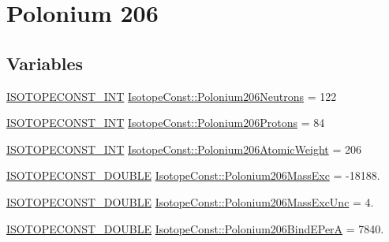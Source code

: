 \hypertarget{group___isotope_const-_polonium-_po206}{}\section{Polonium 206}
\label{group___isotope_const-_polonium-_po206}
\subsection*{Variables}
\begin{DoxyCompactItemize}
\item 
\mbox{\hyperlink{group___isotope_const-_macros_ga5f18360b3e99483a35c32d789e62621c}{I\+S\+O\+T\+O\+P\+E\+C\+O\+N\+S\+T\+\_\+\+I\+NT}} \mbox{\hyperlink{group___isotope_const-_polonium-_po206_ga271199186efeaaab6ef0471e99c22c46}{Isotope\+Const\+::\+Polonium206\+Neutrons}} = 122
\item 
\mbox{\hyperlink{group___isotope_const-_macros_ga5f18360b3e99483a35c32d789e62621c}{I\+S\+O\+T\+O\+P\+E\+C\+O\+N\+S\+T\+\_\+\+I\+NT}} \mbox{\hyperlink{group___isotope_const-_polonium-_po206_gae42fc9330d20091192ff61e116189fea}{Isotope\+Const\+::\+Polonium206\+Protons}} = 84
\item 
\mbox{\hyperlink{group___isotope_const-_macros_ga5f18360b3e99483a35c32d789e62621c}{I\+S\+O\+T\+O\+P\+E\+C\+O\+N\+S\+T\+\_\+\+I\+NT}} \mbox{\hyperlink{group___isotope_const-_polonium-_po206_ga55873615923500a46ce5d4bd2b4f03e9}{Isotope\+Const\+::\+Polonium206\+Atomic\+Weight}} = 206
\item 
\mbox{\hyperlink{group___isotope_const-_macros_ga8f45a7272ce02c0b4c65c44636ed719a}{I\+S\+O\+T\+O\+P\+E\+C\+O\+N\+S\+T\+\_\+\+D\+O\+U\+B\+LE}} \mbox{\hyperlink{group___isotope_const-_polonium-_po206_ga45f1c42a96062895a19ca94b795f943a}{Isotope\+Const\+::\+Polonium206\+Mass\+Exc}} = -\/18188.
\item 
\mbox{\hyperlink{group___isotope_const-_macros_ga8f45a7272ce02c0b4c65c44636ed719a}{I\+S\+O\+T\+O\+P\+E\+C\+O\+N\+S\+T\+\_\+\+D\+O\+U\+B\+LE}} \mbox{\hyperlink{group___isotope_const-_polonium-_po206_ga07661ee0cfcaf969befd171186f9909a}{Isotope\+Const\+::\+Polonium206\+Mass\+Exc\+Unc}} = 4.
\item 
\mbox{\hyperlink{group___isotope_const-_macros_ga8f45a7272ce02c0b4c65c44636ed719a}{I\+S\+O\+T\+O\+P\+E\+C\+O\+N\+S\+T\+\_\+\+D\+O\+U\+B\+LE}} \mbox{\hyperlink{group___isotope_const-_polonium-_po206_gaf8ec9079da7ca5d24fc6d564b37ed29b}{Isotope\+Const\+::\+Polonium206\+Bind\+E\+PerA}} = 7840.
\item 

\end{DoxyCompactItemize}
